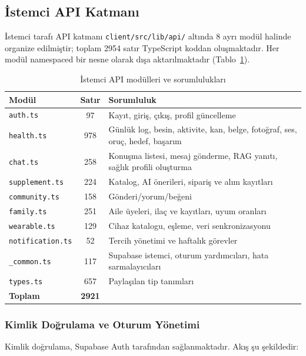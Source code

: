 \subsection{İstemci API Katmanı}

İstemci tarafı API katmanı \texttt{client/src/lib/api/} altında 8 ayrı modül halinde organize edilmiştir; toplam 2954 satır TypeScript koddan oluşmaktadır. Her modül namespaced bir nesne olarak dışa aktarılmaktadır (Tablo~\ref{tab:api_modules}).

\begin{table}[H]
\centering
\caption{İstemci API modülleri ve sorumlulukları}
\label{tab:api_modules}
\begin{tabular}{|l|c|p{}|}
\hline
\textbf{Modül} & \textbf{Satır} & \textbf{Sorumluluk} \\
\hline
\texttt{auth.ts}        & 97   & Kayıt, giriş, çıkış, profil güncelleme \\
\texttt{health.ts}      & 978  & Günlük log, besin, aktivite, kan, belge, fotoğraf, ses, oruç, hedef, başarım \\
\texttt{chat.ts}        & 258  & Konuşma listesi, mesaj gönderme, RAG yanıtı, sağlık profili oluşturma \\
\texttt{supplement.ts}  & 224  & Katalog, AI önerileri, sipariş ve alım kayıtları \\
\texttt{community.ts}   & 158  & Gönderi/yorum/beğeni \\
\texttt{family.ts}      & 251  & Aile üyeleri, ilaç ve kayıtları, uyum oranları \\
\texttt{wearable.ts}    & 129  & Cihaz katalogu, eşleme, veri senkronizasyonu \\
\texttt{notification.ts}& 52   & Tercih yönetimi ve haftalık görevler \\
\texttt{\_common.ts}    & 117  & Supabase istemci, oturum yardımcıları, hata sarmalayıcıları \\
\texttt{types.ts}       & 657  & Paylaşılan tip tanımları \\
\hline
\textbf{Toplam}         & \textbf{2921} & \\
\hline
\end{tabular}
\end{table}

\subsubsection{Kimlik Doğrulama ve Oturum Yönetimi}

Kimlik doğrulama, Supabase Auth tarafından sağlanmaktadır. Akış şu şekildedir:

